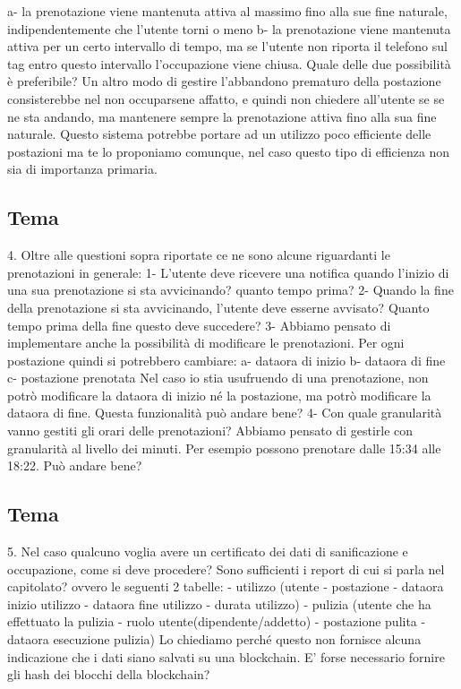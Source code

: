 a- la prenotazione viene mantenuta attiva al massimo fino alla sue fine naturale, indipendentemente che l'utente torni o meno
b- la prenotazione viene mantenuta attiva per un certo intervallo di tempo, ma se l'utente non riporta il telefono sul tag entro questo intervallo l'occupazione viene chiusa.
Quale delle due possibilità è preferibile?
Un altro modo di gestire l'abbandono prematuro della postazione consisterebbe nel non occuparsene affatto, e quindi non chiedere all'utente se se ne sta andando, ma mantenere sempre la prenotazione attiva fino alla sua fine naturale. Questo sistema potrebbe portare ad un utilizzo poco efficiente delle postazioni ma te lo proponiamo comunque, nel caso questo tipo di efficienza non sia di importanza primaria.

\subsection*{Tema}
4. Oltre alle questioni sopra riportate ce ne sono alcune riguardanti le prenotazioni in generale:
1- L'utente deve ricevere una notifica quando l'inizio di una sua prenotazione si sta avvicinando? quanto tempo prima?
2- Quando la fine della prenotazione si sta avvicinando, l'utente deve esserne avvisato? Quanto tempo prima della fine questo deve succedere?
3- Abbiamo pensato di implementare anche la possibilità di modificare le prenotazioni. Per ogni postazione quindi si potrebbero cambiare:
a- dataora di inizio
b- dataora di fine
c- postazione prenotata
Nel caso io stia usufruendo di una prenotazione, non potrò modificare la dataora di inizio né la postazione, ma potrò modificare la dataora di fine.
Questa funzionalità può andare bene?
4- Con quale granularità vanno gestiti gli orari delle prenotazioni? Abbiamo pensato di gestirle con granularità al livello dei minuti. Per esempio possono prenotare dalle 15:34 alle 18:22. Può andare bene?

\subsection*{Tema}
5. Nel caso qualcuno voglia avere un certificato dei dati di sanificazione e occupazione, come si deve procedere? Sono sufficienti i report di cui si parla nel capitolato? ovvero le seguenti 2 tabelle:
- utilizzo (utente - postazione - dataora inizio utilizzo - dataora fine utilizzo - durata utilizzo)
- pulizia (utente che ha effettuato la pulizia - ruolo utente(dipendente/addetto) - postazione pulita - dataora esecuzione pulizia)
Lo chiediamo perché questo non fornisce alcuna indicazione che i dati siano salvati su una blockchain. E' forse necessario fornire gli hash dei blocchi della blockchain?

